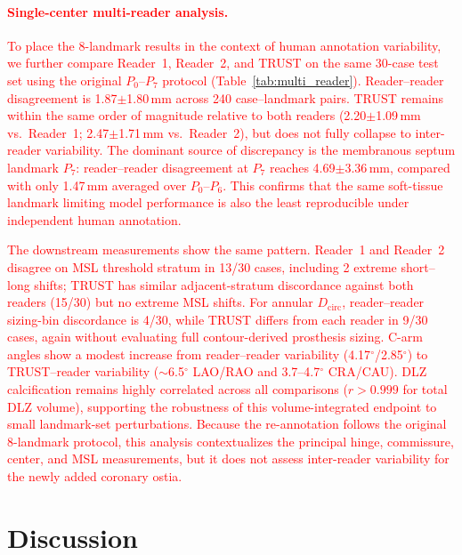 \documentclass[conference]{IEEEtran}
\begin{document}
\paragraph{\textcolor{red}{Single-center multi-reader analysis.}}
\textcolor{red}{To place the 8-landmark results in the context of human annotation variability, we further compare Reader~1, Reader~2, and TRUST on the same 30-case test set using the original $P_0$--$P_7$ protocol (Table~\ref{tab:multi_reader}). Reader--reader disagreement is 1.87$\pm$1.80\,mm across 240 case--landmark pairs. TRUST remains within the same order of magnitude relative to both readers (2.20$\pm$1.09\,mm vs.\ Reader~1; 2.47$\pm$1.71\,mm vs.\ Reader~2), but does not fully collapse to inter-reader variability. The dominant source of discrepancy is the membranous septum landmark $P_7$: reader--reader disagreement at $P_7$ reaches 4.69$\pm$3.36\,mm, compared with only 1.47\,mm averaged over $P_0$--$P_6$. This confirms that the same soft-tissue landmark limiting model performance is also the least reproducible under independent human annotation.}

\textcolor{red}{The downstream measurements show the same pattern. Reader~1 and Reader~2 disagree on MSL threshold stratum in 13/30 cases, including 2 extreme short--long shifts; TRUST has similar adjacent-stratum discordance against both readers (15/30) but no extreme MSL shifts. For annular $D_{\text{circ}}$, reader--reader sizing-bin discordance is 4/30, while TRUST differs from each reader in 9/30 cases, again without evaluating full contour-derived prosthesis sizing. C-arm angles show a modest increase from reader--reader variability (4.17$^\circ$/2.85$^\circ$) to TRUST--reader variability ($\sim$6.5$^\circ$ LAO/RAO and 3.7--4.7$^\circ$ CRA/CAU). DLZ calcification remains highly correlated across all comparisons ($r > 0.999$ for total DLZ volume), supporting the robustness of this volume-integrated endpoint to small landmark-set perturbations. Because the re-annotation follows the original 8-landmark protocol, this analysis contextualizes the principal hinge, commissure, center, and MSL measurements, but it does not assess inter-reader variability for the newly added coronary ostia.}


\section{Discussion}
\label{sec:discussion}
\end{document}

